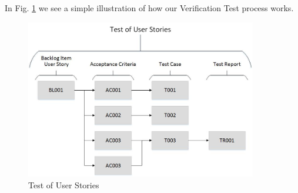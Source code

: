 In Fig. \ref{fig:testsetup} we see a simple illustration of how our Verification Test process works. 
\begin{figure}[h]
    \centering
        \includegraphics[width=0.9\textwidth]{VAPIQ-PICTURES/testdocbild}
        \caption{Test of User Stories}
        \label{fig:testsetup}
\end{figure}




